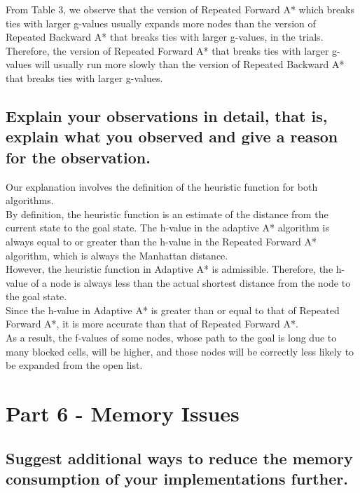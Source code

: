 \documentclass{article}
\begin{document}
From Table 3, we observe that the version of Repeated Forward A* which breaks ties with larger g-values usually expands more nodes than the version of Repeated Backward A* that breaks ties with larger g-values, in the trials. Therefore, the version of Repeated Forward A* that breaks ties with larger g-values will usually run more slowly than the version of Repeated Backward A* that breaks ties with larger g-values.

\subsection{Explain your observations in detail, that is, explain what you observed and give a reason for the observation.}
Our explanation involves the definition of the heuristic function for both algorithms.\\

By definition, the heuristic function is an estimate of the distance from the current state to the goal state. The h-value in the adaptive A* algorithm is always equal to or greater than the h-value in the Repeated Forward A* algorithm, which is always the Manhattan distance.  \\

However, the heuristic function in Adaptive A* is admissible. Therefore, the h-value of a node is always less than the actual shortest distance from the node to the goal state.\\

Since the h-value in Adaptive A* is greater than or equal to that of Repeated Forward A*, it is more accurate than that of Repeated Forward A*. \\

As a result, the f-values of some nodes, whose path to the goal is long due to many blocked cells, will be higher, and those nodes will be correctly less likely to be expanded from the open list.\\



\section{Part 6 - Memory Issues}

\subsection{Suggest additional ways to reduce the memory consumption of your implementations further.}
\end{document}
